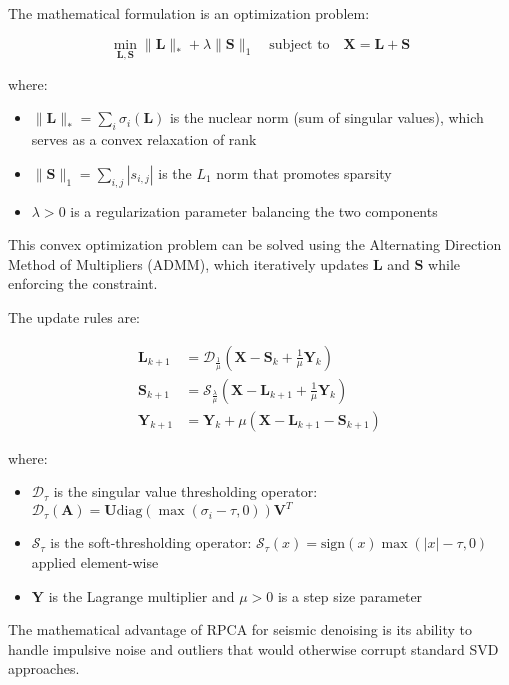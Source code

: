 \documentclass[11pt]{article}
\begin{document}
The mathematical formulation is an optimization problem:

\begin{equation}
\min_{\mathbf{L}, \mathbf{S}} \|\mathbf{L}\|_* + \lambda \|\mathbf{S}\|_1 \quad \text{subject to} \quad \mathbf{X} = \mathbf{L} + \mathbf{S}
\end{equation}

where:
\begin{itemize}
\item $\|\mathbf{L}\|_* = \sum_{i} \sigma_i(\mathbf{L})$ is the nuclear norm (sum of singular values), which serves as a convex relaxation of rank
\item $\|\mathbf{S}\|_1 = \sum_{i,j} |s_{i,j}|$ is the $L_1$ norm that promotes sparsity
\item $\lambda > 0$ is a regularization parameter balancing the two components
\end{itemize}

This convex optimization problem can be solved using the Alternating Direction Method of Multipliers (ADMM), which iteratively updates $\mathbf{L}$ and $\mathbf{S}$ while enforcing the constraint.

The update rules are:

\begin{align}
\mathbf{L}_{k+1} &= \mathcal{D}_{\frac{1}{\mu}}(\mathbf{X} - \mathbf{S}_k + \frac{1}{\mu}\mathbf{Y}_k) \\
\mathbf{S}_{k+1} &= \mathcal{S}_{\frac{\lambda}{\mu}}(\mathbf{X} - \mathbf{L}_{k+1} + \frac{1}{\mu}\mathbf{Y}_k) \\
\mathbf{Y}_{k+1} &= \mathbf{Y}_k + \mu(\mathbf{X} - \mathbf{L}_{k+1} - \mathbf{S}_{k+1})
\end{align}

where:
\begin{itemize}
\item $\mathcal{D}_{\tau}$ is the singular value thresholding operator: $\mathcal{D}_{\tau}(\mathbf{A}) = \mathbf{U}\text{diag}(\max(\sigma_i - \tau, 0))\mathbf{V}^T$
\item $\mathcal{S}_{\tau}$ is the soft-thresholding operator: $\mathcal{S}_{\tau}(x) = \text{sign}(x)\max(|x| - \tau, 0)$ applied element-wise
\item $\mathbf{Y}$ is the Lagrange multiplier and $\mu > 0$ is a step size parameter
\end{itemize}

The mathematical advantage of RPCA for seismic denoising is its ability to handle impulsive noise and outliers that would otherwise corrupt standard SVD approaches.
\end{document}
